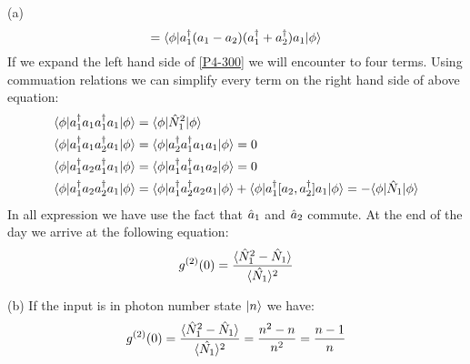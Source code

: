 \begin{homeworkProblem}
\begin{homeworkSection}{(a)}
\begin{equation}
= \langle \phi|a_1^\dagger(a_1-a_2)(a_1^\dagger+a_2^\dagger)a_1|\phi\rangle 
 \end{equation}
 If we expand the left hand side of \eqref{P4-300} we will encounter to four terms. Using commuation relations we can simplify every term on the right hand side of above equation:
 \begin{align}
 \langle \phi| a_1^\dagger a_1 a_1^\dagger a_1|\phi\rangle &=\langle \phi|\Hat{N}_1^2|\phi\rangle\\
  \langle \phi|a_1^\dagger a_1 a_2^\dagger a_1|\phi\rangle &=\langle \phi|a_2^\dagger a_1^\dagger a_1 a_1|\phi\rangle=0\\
 \langle \phi|a_1^\dagger a_2 a_1^\dagger a_1|\phi\rangle&=\langle \phi|a_1^\dagger  a_1^\dagger a_1 a_2|\phi\rangle=0\\
 \langle \phi|a_1^\dagger a_2 a_2^\dagger a_1|\phi\rangle&=\langle \phi|a_1^\dagger a_2^\dagger a_2 a_1|\phi\rangle+
 \langle \phi|a_1^\dagger [a_2, a_2^\dagger] a_1|\phi\rangle
 =-\langle \phi|\Hat{N}_1|\phi\rangle
  \end{align}  
In all expression we have use the fact that $\Hat{a}_1$ and $\Hat{a}_2$ commute. At the end of the day we arrive at the following equation:
 \begin{equation}
 g^{(2)}(0)=\frac{\langle \Hat{N}_1^2-\Hat{N}_1\rangle}{\langle \Hat{N_1}\rangle^2}
 \end{equation}
 \end{homeworkSection}
\begin{homeworkSection}{(b)}
If the input is in photon number state $|n\rangle$ we have:
\begin{equation}
 g^{(2)}(0)=\frac{\langle \Hat{N}_1^2-\Hat{N}_1\rangle}{\langle \Hat{N_1}\rangle^2}
=\frac{n^2-n}{n^2}=\frac{n-1}{n}
\end{equation}

\end{homeworkSection}
\end{homeworkProblem}